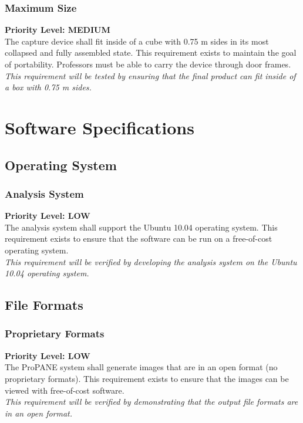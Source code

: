 \documentclass[]{article}
\begin{document}
			
			\subsubsection{Maximum Size}
				\textbf{Priority Level: MEDIUM}\\
				The capture device shall fit inside of a cube with 0.75 m sides in its most collapsed and fully assembled state. This requirement exists to maintain the goal of portability. Professors must be able to carry the device through door frames. \\
				\emph{This requirement will be tested by ensuring that the final product can fit inside of a box with 0.75 m sides.}
			
	
	\section{Software Specifications}
	
		\subsection{Operating System}
			
			\subsubsection{Analysis System}
				\textbf{Priority Level: LOW}\\
				The analysis system shall support the Ubuntu 10.04 operating system. This requirement exists to ensure that the software can be run on a free-of-cost operating system. \\
				\emph{This requirement will be verified by developing the analysis system on the Ubuntu 10.04 operating system.}
				
		
		\subsection{File Formats}
			
			\subsubsection{Proprietary Formats}
				\textbf{Priority Level: LOW}\\
				The ProPANE system shall generate images that are in an open format (no proprietary formats). This requirement exists to ensure that the images can be viewed with free-of-cost software. \\
				\emph{This requirement will be verified by demonstrating that the output file formats are in an open format.}
				
\end{document}
